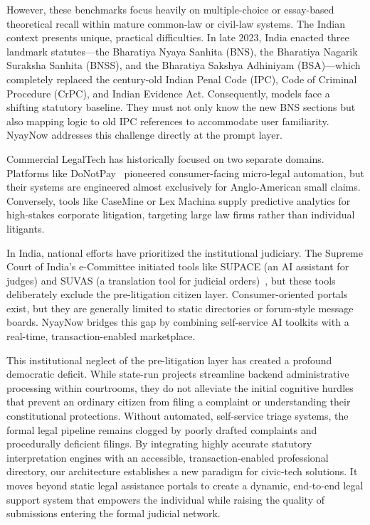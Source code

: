 \documentclass[conference]{IEEEtran}
\begin{document}
However, these benchmarks focus heavily on multiple-choice or essay-based theoretical recall within mature common-law or civil-law systems. The Indian context presents unique, practical difficulties. In late 2023, India enacted three landmark statutes---the Bharatiya Nyaya Sanhita (BNS), the Bharatiya Nagarik Suraksha Sanhita (BNSS), and the Bharatiya Sakshya Adhiniyam (BSA)---which completely replaced the century-old Indian Penal Code (IPC), Code of Criminal Procedure (CrPC), and Indian Evidence Act. Consequently, models face a shifting statutory baseline. They must not only know the new BNS sections but also mapping logic to old IPC references to accommodate user familiarity. NyayNow addresses this challenge directly at the prompt layer.

Commercial LegalTech has historically focused on two separate domains. Platforms like DoNotPay~\cite{donotpay} pioneered consumer-facing micro-legal automation, but their systems are engineered almost exclusively for Anglo-American small claims. Conversely, tools like CaseMine or Lex Machina supply predictive analytics for high-stakes corporate litigation, targeting large law firms rather than individual litigants. 

In India, national efforts have prioritized the institutional judiciary. The Supreme Court of India's e-Committee initiated tools like SUPACE (an AI assistant for judges) and SUVAS (a translation tool for judicial orders)~\cite{ecommittee2023}, but these tools deliberately exclude the pre-litigation citizen layer. Consumer-oriented portals exist, but they are generally limited to static directories or forum-style message boards. NyayNow bridges this gap by combining self-service AI toolkits with a real-time, transaction-enabled marketplace.

This institutional neglect of the pre-litigation layer has created a profound democratic deficit. While state-run projects streamline backend administrative processing within courtrooms, they do not alleviate the initial cognitive hurdles that prevent an ordinary citizen from filing a complaint or understanding their constitutional protections. Without automated, self-service triage systems, the formal legal pipeline remains clogged by poorly drafted complaints and procedurally deficient filings. By integrating highly accurate statutory interpretation engines with an accessible, transaction-enabled professional directory, our architecture establishes a new paradigm for civic-tech solutions. It moves beyond static legal assistance portals to create a dynamic, end-to-end legal support system that empowers the individual while raising the quality of submissions entering the formal judicial network.
\end{document}
